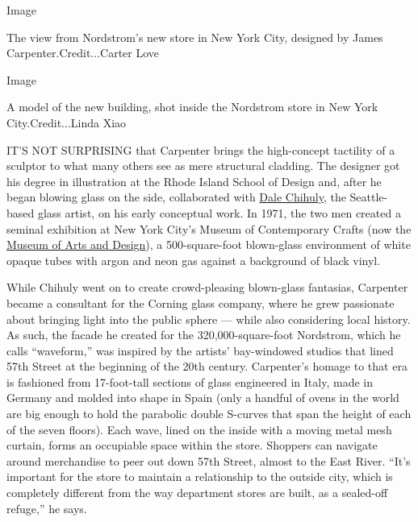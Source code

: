 Image

The view from Nordstrom's new store in New York City, designed by James
Carpenter.Credit...Carter Love

Image

A model of the new building, shot inside the Nordstrom store in New York
City.Credit...Linda Xiao

IT'S NOT SURPRISING that Carpenter brings the high-concept tactility of
a sculptor to what many others see as mere structural cladding. The
designer got his degree in illustration at the Rhode Island School of
Design and, after he began blowing glass on the side, collaborated with
\href{https://www.nytimes3xbfgragh.onion/2017/04/26/arts/design/are-there-glass-snakes-in-dale-chihulys-fragile-eden.html}{Dale
Chihuly}, the Seattle-based glass artist, on his early conceptual work.
In 1971, the two men created a seminal exhibition at New York City's
Museum of Contemporary Crafts (now the
\href{https://www.nytimes3xbfgragh.onion/topic/organization/museum-of-arts-and-design}{Museum
of Arts and Design}), a 500-square-foot blown-glass environment of white
opaque tubes with argon and neon gas against a background of black
vinyl.

While Chihuly went on to create crowd-pleasing blown-glass fantasias,
Carpenter became a consultant for the Corning glass company, where he
grew passionate about bringing light into the public sphere --- while
also considering local history. As such, the facade he created for the
320,000-square-foot Nordstrom, which he calls ``waveform,'' was inspired
by the artists' bay-windowed studios that lined 57th Street at the
beginning of the 20th century. Carpenter's homage to that era is
fashioned from 17-foot-tall sections of glass engineered in Italy, made
in Germany and molded into shape in Spain (only a handful of ovens in
the world are big enough to hold the parabolic double S-curves that span
the height of each of the seven floors). Each wave, lined on the inside
with a moving metal mesh curtain, forms an occupiable space within the
store. Shoppers can navigate around merchandise to peer out down 57th
Street, almost to the East River. ``It's important for the store to
maintain a relationship to the outside city, which is completely
different from the way department stores are built, as a sealed-off
refuge,'' he says.

